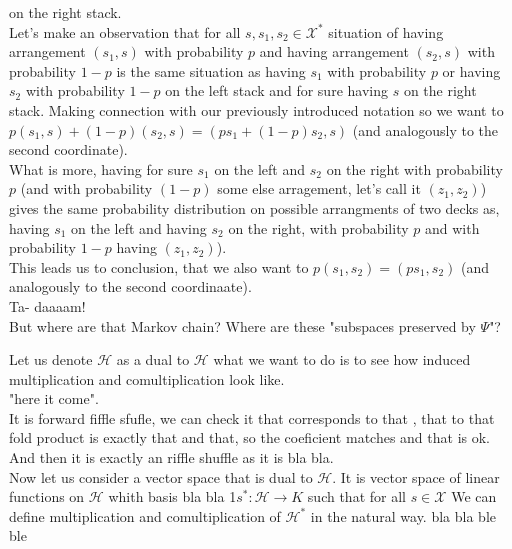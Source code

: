 \documentclass[a4paper]{article}
\begin{document}
on the right stack. \\
Let's make an observation that for all $s, s_1, s_2 \in \mathcal{X}^*$ situation of having arrangement
$(s_1, s)$ with probability $p$ and having arrangement $(s_2, s)$ with probability $1-p$ is
the same situation as having $s_1$ with probability $p$ or having $s_2$ with probability $1 - p$ on the left
stack and for sure having $s$ on the right stack. Making connection with our previously introduced notation
so we want to $p(s_1, s) + (1-p)(s_2, s) = (ps_1 + (1-p)s_2, s)$ (and analogously to the second
coordinate).\\
What is more, having for sure $s_1$ on the left and $s_2$ on the right with probability $p$ (and
with probability $(1 - p)$ some else arragement, let's call it $(z_1, z_2)$) gives the same probability
distribution
on possible arrangments of two decks as, having $s_1$ on the left and having $s_2$ on the
right, with probability $p$ and with probability $1-p$ having $(z_1,z_2)$).\\
This leads us to conclusion, that we also want to $p(s_1,s_2) = (ps_1, s_2)$ (and analogously to the second
coordinaate). \\
 Ta- daaaam! \\[4pt]
But where are that Markov chain? Where are these "subspaces preserved by $\Psi$"?

Let us denote $\mathcal{H}$ as a dual to $\mathcal{H}$ what we want to do is to see how induced
multiplication and comultiplication look like. \\
"here it come". \\
It is forward fiffle sfufle, we can check it
that corresponds to that , that to that
fold product is exactly that and that, so the coeficient matches and that is ok. \\
And then it is exactly an riffle shuffle as it is bla bla. \\

Now let us consider a vector space that is dual to $\mathcal{H}$. It is vector space of linear functions on
$\mathcal{H}$
whith basis bla bla
1$s^* : \mathcal{H} \to K$ such that for all $s \in \mathcal{X }$
We can define multiplication and comultiplication of $\mathcal{H}^*$ in the natural way.
bla bla
ble ble
\end{document}
